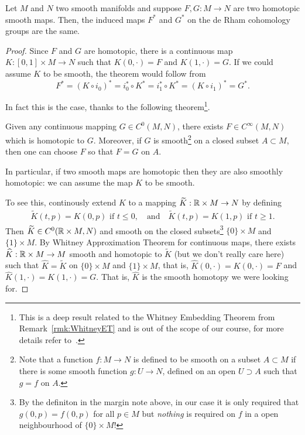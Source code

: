\begin{theorem}
  Let $M$ and $N$ two smooth manifolds and suppose $F,G: M\to N$ are two homotopic smooth maps.
  Then, the induced maps $F^*$ and $G^*$ on the de Rham cohomology groups are the same.
\end{theorem}
\begin{proof}
  Since $F$ and $G$ are homotopic, there is a continuous map $K: [0,1]\times M \to N$ such that $K(0,\cdot) = F$ and $K(1,\cdot) = G$.
  If we could assume $K$ to be smooth, the theorem would follow from
  \begin{equation}
    F^* = (K\circ i_0)^* = i_0^*\circ K^* = i_1^*\circ K^* = (K\circ i_1)^* = G^*.
  \end{equation}

  In fact this is the case, thanks to the following theorem\footnote{This is a deep result related to the Whitney Embedding Theorem from Remark~\ref{rmk:WhitneyET} and is out of the scope of our course, for more details refer to~\cite[Chapter 6 and Theorems 6.26 and 9.27]{book:lee}.}.
  \begin{theorem}\label{thm:WhitneyApproxCont}
    Given any continuous mapping $G \in C^0(M,N)$, there exists $F \in C^\infty(M,N)$ which is homotopic to $G$. Moreover, if $G$ is smooth\footnote{Note that a function $f : M \to N$ is defined to be smooth on a subset $A \subset M$ if there is some smooth function $g: U \to N$, defined on an open $U\supset A$ such that $g = f$ on $A$.} on a closed subset $A\subset M$, then one can choose $F$ so that $F=G$ on $A$.
  \end{theorem}
  In particular, if two smooth maps are homotopic then they are also smoothly homotopic: we can assume the map $K$ to be smooth.

  To see this, continously extend $K$ to a mapping $\widetilde K : \mathbb{R} \times M \to N$ by defining
  \begin{align}
    \widetilde K(t, p) = K(0, p) \mbox{ if } t \leq 0,
    \quad\mbox{and}\quad \widetilde K(t, p) = K(1, p) \mbox{ if } t \geq 1.
  \end{align}
  Then $\widetilde K \in C^0(\mathbb{R}\times M, N)$ and smooth on the closed subsets\footnote{By the definiton in the margin note above, in our case it is only required that $g(0, p) = f(0,p)$ for all $p\in M$ but \emph{nothing} is required on $f$ in a open neighbourhood of $\{0\}\times M$!} $\{0\}\times M$ and $\{1\}\times M$.
  By Whitney Approximation Theorem for continuous maps, there exists $\widehat K : \mathbb{R}\times M \to M$ smooth and homotopic to $\widetilde K$ (but we don't really care here) such that $\widehat K = \widetilde K$ on $\{0\}\times M$ and $\{1\}\times M$, that is, $\widehat K(0, \cdot) = K(0, \cdot) = F$ and $\widehat K(1, \cdot) = K(1, \cdot) = G$.
  That is, $\hat K$ is the smooth homotopy we were looking for.
\end{proof}

